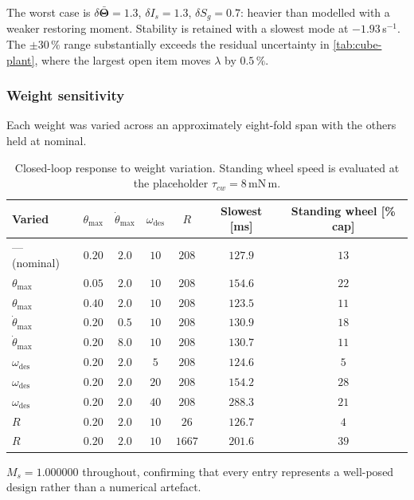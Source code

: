 The worst case is $\delta\bar{\bm{\Theta}} = 1.3$, $\delta I_s = 1.3$,
$\delta S_g = 0.7$: heavier than modelled with a weaker restoring moment.
Stability is retained with a slowest mode at $-1.93$\,s$^{-1}$. The
$\pm 30\,\%$ range substantially exceeds the residual uncertainty in
\cref{tab:cube-plant}, where the largest open item moves $\lambda$ by
$0.5\,\%$.

\subsubsection{Weight sensitivity}
\label{sec:weight-sensitivity}

Each weight was varied across an approximately eight-fold span with the
others held at nominal.

\begin{table}[htbp]
\centering
\small
\begin{tabular}{@{}lcccccc@{}}
\toprule
\textbf{Varied} & $\theta_{\max}$ & $\dot\theta_{\max}$ & $\omega_{\mathrm{des}}$ & $R$
& \textbf{Slowest} [ms] & \textbf{Standing wheel} [\% cap]\\
\midrule
--- (nominal) & $0.20$ & $2.0$ & $10$ & $208$ & $127.9$ & $13$\\
$\theta_{\max}$ & $0.05$ & $2.0$ & $10$ & $208$ & $154.6$ & $22$\\
$\theta_{\max}$ & $0.40$ & $2.0$ & $10$ & $208$ & $123.5$ & $11$\\
$\dot\theta_{\max}$ & $0.20$ & $0.5$ & $10$ & $208$ & $130.9$ & $18$\\
$\dot\theta_{\max}$ & $0.20$ & $8.0$ & $10$ & $208$ & $130.7$ & $11$\\
$\omega_{\mathrm{des}}$ & $0.20$ & $2.0$ & $5$ & $208$ & $124.6$ & $5$\\
$\omega_{\mathrm{des}}$ & $0.20$ & $2.0$ & $20$ & $208$ & $154.2$ & $28$\\
$\omega_{\mathrm{des}}$ & $0.20$ & $2.0$ & $40$ & $208$ & $288.3$ & $21$\\
$R$ & $0.20$ & $2.0$ & $10$ & $26$ & $126.7$ & $4$\\
$R$ & $0.20$ & $2.0$ & $10$ & $1667$ & $201.6$ & $39$\\
\bottomrule
\end{tabular}
\caption{Closed-loop response to weight variation. Standing wheel speed is
evaluated at the placeholder $\tau_{cw} = 8$\,mN\,m.}
\label{tab:weight-sensitivity}
\end{table}

$M_s = 1.000000$ throughout, confirming that every entry represents a
well-posed design rather than a numerical artefact.

